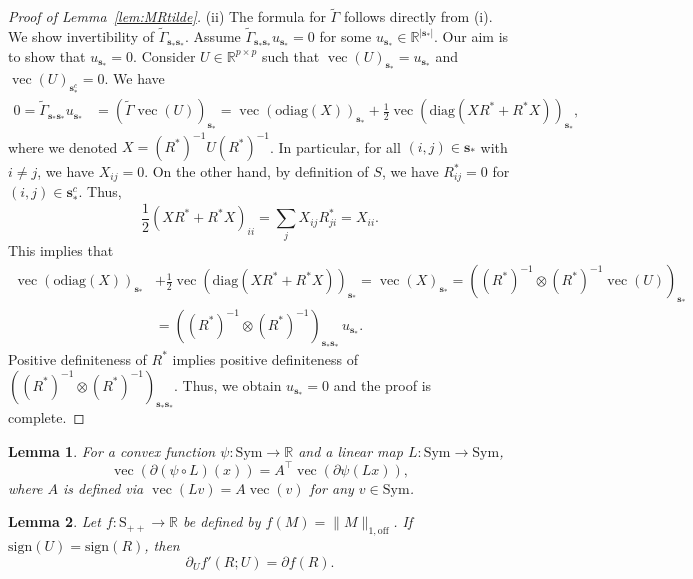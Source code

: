\documentclass[12pt]{amsart}
\numberwithin{equation}{section}
\numberwithin{equation}{section}
\theoremstyle{plain}
\newtheorem{lemma}{Lemma}
\theoremstyle{definition}
\newcommand{\diag}[1]{\mathrm{diag}(#1)}
\newcommand{\odiag}[1]{\mathrm{odiag}(#1)}
\newcommand{\Spp}{\mathrm{S}_{++}}
\newcommand{\R}{\mathbb{R}}
\newcommand{\Sym}{\mathrm{Sym}}
\newcommand{\sign}{\mathrm{sign}}
\newcommand{\Supp}{\mathbf{s}_\ast}
\begin{document}
\begin{proof}[Proof of Lemma~\ref{lem:MRtilde}]
(ii) The formula for $\tilde{\Gamma}$ follows directly from (i). \\
We show invertibility of $\tilde{\Gamma}_{\Supp\Supp}$. Assume $\tilde{\Gamma}_{\Supp\Supp}u_{\Supp}=0$ for some $u_{\Supp}\in\mathbb{R}^{|\Supp|}$. Our aim is to show that $u_{\Supp}=0$. Consider $U\in\R^{p\times p}$ such that $\operatorname{vec}(U)_{\Supp}=u_{\Supp}$ and $\operatorname{vec}(U)_{\Supp^c}=0$. We have
\begin{align*}
0=\tilde{\Gamma}_{\Supp\Supp}u_{\Supp}&=(\tilde{\Gamma}\operatorname{vec}(U))_{\Supp}=\operatorname{vec}(\odiag X)_{\Supp}+\frac{1}{2}\operatorname{vec}(\diag{XR^\ast+R^\ast X})_{\Supp},
\end{align*}
where we denoted $X=(R^\ast)^{-1}U(R^\ast)^{-1}$. In particular, for all $(i,j)\in \Supp$ with $i\neq j$, we have $X_{ij}=0$. On the other hand, by definition of $S$, we have $R^\ast_{ij}=0$ for $(i,j)\in \Supp^c$. Thus, 
\[
\frac12(XR^\ast+R^\ast X)_{ii} = \sum_{j} X_{ij}R_{ji}^\ast =X_{ii}. 
\]
This implies that 
\begin{align*}
\operatorname{vec}(\odiag X)_{\Supp}&+\frac{1}{2}\operatorname{vec}(\diag{XR^\ast+R^\ast X})_{\Supp} = \operatorname{vec}(X)_{\Supp} = ((R^\ast)^{-1}\otimes (R^\ast)^{-1}\operatorname{vec}(U) )_{\Supp} \\
&=((R^\ast)^{-1}\otimes (R^\ast)^{-1})_{\Supp\Supp} \,u_{\Supp}.
\end{align*}
Positive definiteness of $R^\ast$ implies positive definiteness of $((R^\ast)^{-1}\otimes (R^\ast)^{-1})_{\Supp\Supp}$. Thus, we obtain $u_{\Supp}=0$ and the proof is complete.
\end{proof}


\begin{lemma}\label{lem:chainrule}
   For a convex function $\psi\colon \Sym\to \R$ and a linear map $L\colon \Sym\to \Sym$, 
\[
\operatorname{vec}(\partial(\psi\circ L)(x)) = A^\top \operatorname{vec}(\partial \psi(L x)),
\]
where $A$ is defined via $\operatorname{vec}(L v) = A \operatorname{vec}(v)$ for any $v\in\Sym$.  
\end{lemma}
 
\begin{lemma}\label{lem:subgradients}
Let $f\colon \Spp\to \R$ be defined by $f(M)=\|M\|_{1,\mathrm{off}}$.
If $\sign(U)=\sign(R)$, then
\[
\partial_U f'(R;U)=\partial f(R).
\]
\end{lemma}
\end{document}
